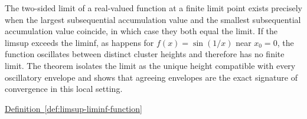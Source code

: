 \begin{remark*}[Interpretation]
The two-sided limit of a real-valued function at a finite limit point exists precisely when the largest subsequential accumulation value and the smallest subsequential accumulation value coincide, in which case they both equal the limit. If the limsup exceeds the liminf, as happens for $f(x) = \sin(1/x)$ near $x_0 = 0$, the function oscillates between distinct cluster heights and therefore has no finite limit. The theorem isolates the limit as the unique height compatible with every oscillatory envelope and shows that agreeing envelopes are the exact signature of convergence in this local setting.
\end{remark*}

\begin{dependencies}
\hyperref[def:limsup-liminf-function]{Definition~\ref*{def:limsup-liminf-function}}
\end{dependencies}
